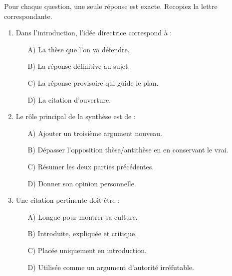 \documentclass[11pt]{article}
\begin{document}
\begin{exercice}
Pour chaque question, une seule réponse est exacte. Recopiez la lettre correspondante.
\begin{enumerate}
    \item Dans l'introduction, l'\og idée directrice \fg{} correspond à :
    \begin{itemize}
        \item[A)] La thèse que l'on va défendre.
        \item[B)] La réponse définitive au sujet.
        \item[C)] La réponse provisoire qui guide le plan.
        \item[D)] La citation d'ouverture.
    \end{itemize}
    \item Le rôle principal de la synthèse est de :
    \begin{itemize}
        \item[A)] Ajouter un troisième argument nouveau.
        \item[B)] Dépasser l'opposition thèse/antithèse en en conservant le vrai.
        \item[C)] Résumer les deux parties précédentes.
        \item[D)] Donner son opinion personnelle.
    \end{itemize}
    \item Une citation pertinente doit être :
    \begin{itemize}
        \item[A)] Longue pour montrer sa culture.
        \item[B)] Introduite, expliquée et critique.
        \item[C)] Placée uniquement en introduction.
        \item[D)] Utilisée comme un argument d'autorité irréfutable.
    \end{itemize}
\end{enumerate}
\end{exercice}
\end{document}
